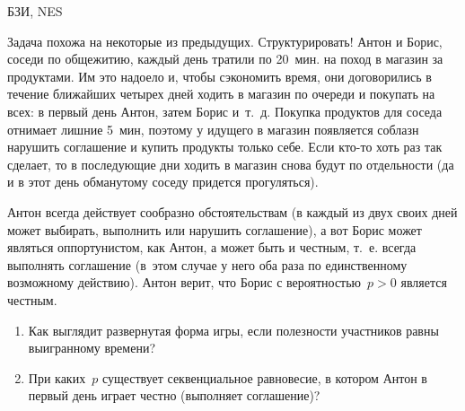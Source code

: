 \begin{problem}[Соседи.]\begin{source}
БЗИ, NES
\end{source}
{\red Задача похожа на некоторые из предыдущих. Структурировать!}
Антон и Борис, соседи по общежитию,
каждый день тратили по 20~мин. на поход в магазин за
продуктами. Им это надоело и, чтобы сэкономить время, они
договорились в течение ближайших четырех дней ходить в
магазин по очереди и покупать на всех: в первый день Антон,
затем Борис и~т.~д. Покупка продуктов для соседа отнимает
лишние 5~мин, поэтому у идущего в магазин появляется
соблазн нарушить соглашение и купить продукты только себе.
Если кто-то хоть раз так сделает, то в последующие дни
ходить в магазин снова будут по отдельности (да и в этот
день обманутому соседу придется прогуляться).

Антон всегда действует сообразно обстоятельствам (в каждый
из двух своих дней может выбирать, выполнить или нарушить
соглашение), а вот Борис может являться оппортунистом, как
Антон, а может быть и честным, т.~е. всегда выполнять
соглашение (в~этом случае у него оба раза по единственному
возможному действию). Антон верит, что Борис с
вероятностью~$p>0$ является честным.

\begin{enumerate}
  \item Как выглядит развернутая форма игры, если полезности
  участников равны выигранному времени?
  \item При каких~$p$ существует секвенциальное  равновесие,
  в котором Антон в первый день играет честно (выполняет
  соглашение)?
\end{enumerate}






\begin{sol}

\end{sol}
\end{problem}




